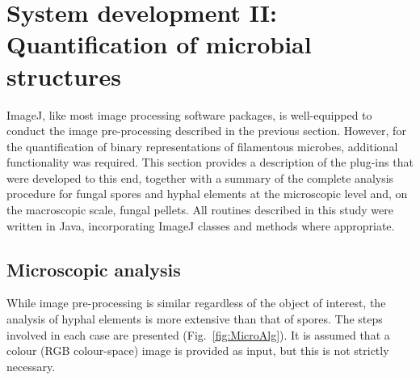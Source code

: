 \section{System development II: Quantification of microbial structures}

ImageJ, like most image processing software packages, is well-equipped to conduct the image pre-processing described in the previous section. However, for the quantification of binary representations of filamentous microbes, additional functionality was required. This section provides a description of the plug-ins that were developed to this end, together with a summary of the complete analysis procedure for fungal spores and hyphal elements at the microscopic level and, on the macroscopic scale, fungal pellets. All routines described in this study were written in Java, incorporating ImageJ classes and methods where appropriate.

\subsection{Microscopic analysis}\label{sec:MicroAnalysis}

While image pre-processing is similar regardless of the object of interest, the analysis of hyphal elements is more extensive than that of spores. The steps involved in each case are presented (Fig.~\ref{fig:MicroAlg}). It is assumed that a colour (RGB colour-space) image is provided as input, but this is not strictly necessary.

